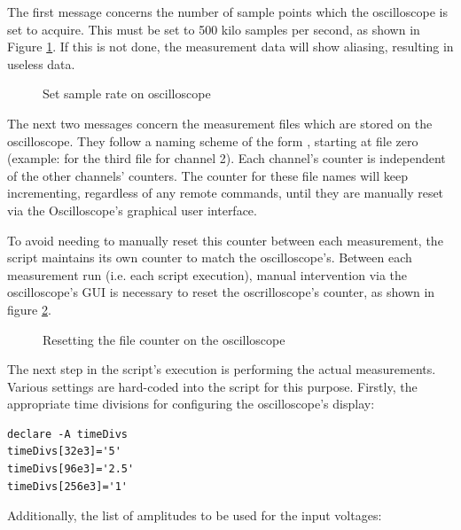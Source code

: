 The first message concerns the number  of sample points which the oscilloscope
is set to acquire. This  must be set to \num{500} kilo  samples per second, as
shown in  Figure \ref{fig:kilosamples}. If this  is not done,  the measurement
data will show aliasing, resulting in useless data.

\begin{figure}
    \centering
    \caption{Set sample rate on oscilloscope}
    \label{fig:kilosamples}
\end{figure}

The  next  two  messages  concern  the  measurement  files  which  are  stored
on   the  oscilloscope.    They   follow   a  naming   scheme   of  the   form
,   starting   at  file   zero   (example:
  for the  third  file for  channel 2). Each  channel's
counter is independent of the  other channels' counters. The counter for these
file names  will keep incrementing,  regardless of any remote  commands, until
they are manually reset via the Oscilloscope's graphical user interface.

To avoid needing to manually reset  this counter between each measurement, the
script maintains  its own  counter to  match the  oscilloscope's. Between each
measurement  run (i.e.  each script  execution), manual  intervention via  the
oscilloscope's GUI is necessary to reset the oscrilloscope's counter, as shown
in figure \ref{fig:fileCounterReset}.

\begin{figure}
    \centering
    \caption{Resetting the file counter on the oscilloscope}
    \label{fig:fileCounterReset}
\end{figure}

The  next   step  in   the  script's  execution   is  performing   the  actual
measurements. Various  settings  are  hard-coded  into  the  script  for  this
purpose. Firstly,  the   appropriate  time   divisions  for   configuring  the
oscilloscope's display\footnotemark:

\begin{verbatim}
declare -A timeDivs
timeDivs[32e3]='5'
timeDivs[96e3]='2.5'
timeDivs[256e3]='1'
\end{verbatim}


Additionally, the list of amplitudes to be used for the input voltages:

